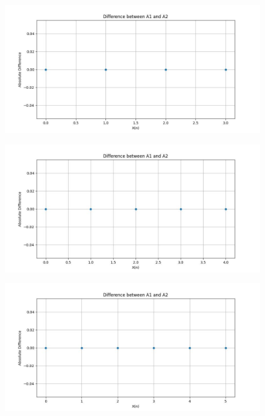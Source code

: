 \documentclass{article}
\begin{document}
\begin{figure}
    \centering
    \includegraphics[width=1\linewidth]{h1_plot_4.jpg}
    \label{fig:enter-label}
\end{figure}

\begin{figure}
    \centering
    \includegraphics[width=1\linewidth]{h1_plot_5.jpg}
    \label{fig:enter-label}
\end{figure}

\begin{figure}
    \centering
    \includegraphics[width=1\linewidth]{h1_plot_6.jpg}
    \label{fig:enter-label}
\end{figure}
\end{document}
